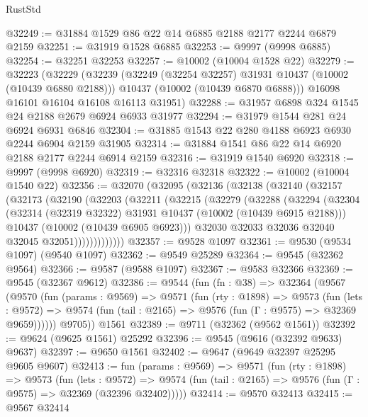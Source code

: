 \begin{lexlean}{RustStd}
\begin{coremodule}
@32249 := @31884 @1529 @86 @22 @14 @6885 @2188 @2177 @2244 @6879 @2159
@32251 := @31919 @1528 @6885
@32253 := @9997 (@9998 @6885)
@32254 := @32251 @32253
@32257 := @10002 (@10004 @1528 @22)
@32279 := @32223
    (@32229
      (@32239
        (@32249 (@32254 @32257) @31931 @10437 (@10002 (@10439 @6880 @2188)))
        @10437
        (@10002 (@10439 @6870 @6888)))
      @16098
      @16101
      @16104
      @16108
      @16113
      @31951)
@32288 := @31957 @6898 @324 @1545 @24 @2188 @2679 @6924 @6933 @31977
@32294 := @31979 @1544 @281 @24 @6924 @6931 @6846
@32304 := @31885 @1543 @22 @280 @4188 @6923 @6930 @2244 @6904 @2159 @31905
@32314 := @31884 @1541 @86 @22 @14 @6920 @2188 @2177 @2244 @6914 @2159
@32316 := @31919 @1540 @6920
@32318 := @9997 (@9998 @6920)
@32319 := @32316 @32318
@32322 := @10002 (@10004 @1540 @22)
@32356 := @32070
    (@32095
      (@32136
        (@32138
          (@32140
            (@32157
              (@32173
                (@32190
                  (@32203
                    (@32211
                      (@32215
                        (@32279
                          (@32288
                            (@32294
                              (@32304
                                (@32314 (@32319 @32322) @31931 @10437 (@10002 (@10439 @6915 @2188)))
                                @10437
                                (@10002 (@10439 @6905 @6923)))
                              @32030
                              @32033
                              @32036
                              @32040
                              @32045
                              @32051)))))))))))))
@32357 := @9528 @1097
@32361 := @9530 (@9534 @1097) (@9540 @1097)
@32362 := @9549 @25289
@32364 := @9545 (@32362 @9564)
@32366 := @9587 (@9588 @1097)
@32367 := @9583 @32366
@32369 := @9545 (@32367 @9612)
@32386 := @9544
    (fun (fn : @38) =>
    @32364
      (@9567
        (@9570
          (fun (params : @9569) =>
          @9571
            (fun (rty : @1898) =>
            @9573
              (fun (lets : @9572) =>
              @9574 (fun (tail : @2165) => @9576 (fun (Γ : @9575) => @32369 @9659))))))
        @9705))
    @1561
@32389 := @9711 (@32362 (@9562 @1561))
@32392 := @9624 (@9625 @1561) @25292
@32396 := @9545 (@9616 (@32392 @9633) @9637)
@32397 := @9650 @1561
@32402 := @9647 (@9649 @32397 @25295 @9605 @9607)
@32413 := fun (params : @9569) =>
  @9571
    (fun (rty : @1898) =>
    @9573
      (fun (lets : @9572) =>
      @9574 (fun (tail : @2165) => @9576 (fun (Γ : @9575) => @32369 (@32396 @32402)))))
@32414 := @9570 @32413
@32415 := @9567 @32414

\end{coremodule}
\end{lexlean}
